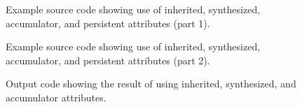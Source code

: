 \begin{figure}[!h]
{\indent
{\mySmallFontSize

\begin{latexonly}
   
\end{latexonly}

\begin{htmlonly}
   
\end{htmlonly}

}
}
\caption{Example source code showing use of inherited, synthesized, accumulator, and persistent attributes (part 1).}
\label{Tutorial:exampleLoopNestingInfoProcessing}
\end{figure}



\begin{latexonly}
\begin{figure}[!h]
{\indent
{\mySmallFontSize

   
}

}\caption{Example source code showing use of inherited, synthesized, accumulator, and persistent attributes (part 2).}
\label{Tutorial:exampleLoopNestingInfoProcessing2}
\end{figure}
\end{latexonly}


\begin{figure}[!h]
{\indent
{\mySmallFontSize

\begin{latexonly}
   
\end{latexonly}

\begin{htmlonly}
   
\end{htmlonly}

}
}
\caption{Output code showing the result of using inherited, synthesized, and accumulator attributes.}
\label{Tutorial:exampleOutput_loopNestingInfoProcessing}
\end{figure}

